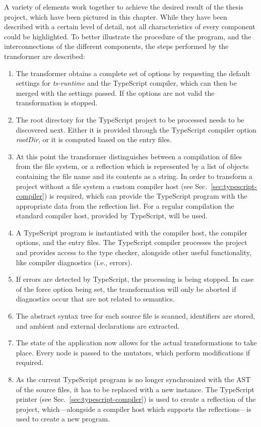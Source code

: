 A variety of elements work together to achieve the desired result of the thesis project, which have been pictured in this chapter. While they have been described with a certain level of detail, not all characteristics of every component could be highlighted. To better illustrate the procedure of the program, and the interconnections of the different components, the steps performed by the transformer are described:
\begin{enumerate}
  \item The transformer obtains a complete set of options by requesting the default settings for \emph{ts-runtime} and the TypeScript compiler, which can then be merged with the settings passed. If the options are not valid the transformation is stopped.
  \item The root directory for the TypeScript project to be processed needs to be discovered next. Either it is provided through the TypeScript compiler option \emph{rootDir}, or it is computed based on the entry files.
  \item At this point the transformer distinguishes between a compilation of files from the file system, or a reflection which is represented by a list of objects containing the file name and its contents as a string. In order to transform a project without a file system a custom compiler host (see Sec.~\ref{sec:typescript-compiler}) is required, which can provide the TypeScript program with the appropriate data from the reflection list. For a regular compilation the standard compiler host, provided by TypeScript, will be used.
  \item A TypeScript program is instantiated with the compiler host, the compiler options, and the entry files. The TypeScript compiler processes the project and provides access to the type checker, alongside other useful functionality, like compiler diagnostics (i.e., errors).
  \item If errors are detected by TypeScript, the processing is being stopped. In case of the force option being set, the transformation will only be aborted if diagnostics occur that are not related to semantics.
  \item The abstract syntax tree for each source file is scanned, identifiers are stored, and ambient and external declarations are extracted.
  \item The state of the application now allows for the actual transformations to take place. Every node is passed to the mutators, which perform modifications if required.
  \item As the current TypeScript program is no longer synchronized with the AST of the source files, it has to be replaced with a new instance. The TypeScript printer (see Sec.~\ref{sec:typescript-compiler}) is used to create a reflection of the project, which---alongside a compiler host which supports the reflections---is used to create a new program.

\end{enumerate}
